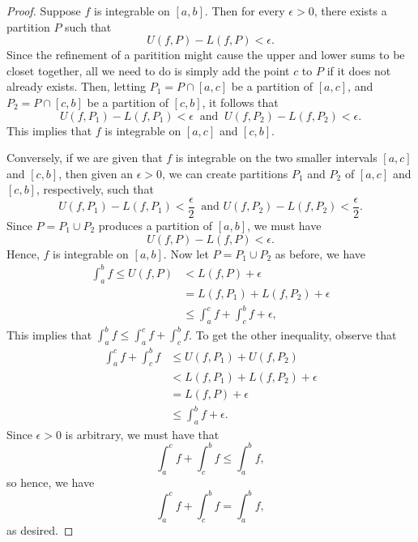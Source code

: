 \begin{proof}
	Suppose \( f \) is integrable on \( [a,b]  \). Then for every \( \epsilon > 0   \), there exists a partition \( P  \) such that 
	\[  U(f,P) - L(f,P) < \epsilon. \]
	Since the refinement of a paritition might cause the upper and lower sums to be closet together, all we need to do is simply add the point \( c  \) to \( P  \) if it does not already exists. Then, letting \( P_{1} = P \cap [a,c]  \) be a partition of \( [a,c]  \), and \( P_{2} = P \cap [c,b]  \) be a partition of \( [c,b]  \), it follows that 
	\[  U(f,P_{1}) - L(f, P_{1}) < \epsilon \ \text{ and } \ U(f, P_{2}) - L(f, P_{2}) < \epsilon. \] This implies that \( f  \) is integrable on \( [a,c]  \) and \( [c,b]  \).

	Conversely, if we are given that \( f  \) is integrable on the two smaller intervals \( [a,c]  \) and \( [c,b] \), then given an \( \epsilon > 0  \), we can create partitions \( P_{1}   \) and \( P_{2} \) of \( [a,c] \) and \( [c,b] \), respectively, such that 
	\[  U(f, P_{1}) - L(f, P_{1}) < \frac{ \epsilon  }{ 2  } \ \text{ and } U(f, P_{2}) - L(f,P_{2}) < \frac{ \epsilon  }{ 2 }.  \]
	Since \( P = P_{1} \cup P_{2}  \) produces a partition of \( [a,b]  \), we must have 
	\[ U(f, P) - L(f,P) < \epsilon.  \] Hence, \( f  \) is integrable on \( [a,b]  \).
	Now let \( P = P_{1} \cup P_{2} \) as before, we have 
	\begin{align*}
		\int_{ a }^{ b } f  \leq U(f, P) &< L(f, P)  + \epsilon  \\
										 &= L(f, P_{1}) + L(f, P_{2}) + \epsilon \\
										 &\leq \int_{ a }^{ c } f  + \int_{ c }^{ b } f + \epsilon,
	\end{align*}
	This implies that \( \int_{ a }^{ b } f \leq \int_{ a }^{ c }f + \int_{ c }^{ b }  f \). To get the other inequality, observe that 
	\begin{align*}
	    \int_{ a }^{ c } f + \int_{ c }^{ b } f   &\leq U(f, P_{1}) + U(f, P_{2})  \\
												  &< L(f, P_{1}) + L(f, P_{2}) + \epsilon \\
												  &= L(f, P) + \epsilon \\
												  &\leq \int_{ a }^{ b } f + \epsilon.
	\end{align*}
	Since \( \epsilon > 0  \) is arbitrary, we must have that 
	\[  \int_{ a }^{ c } f + \int_{ c }^{ b } f \leq \int_{ a }^{ b } f, \]
	so hence, we have 
	\[  \int_{ a }^{ c } f  + \int_{ c }^{ b } f = \int_{ a }^{ b } f, \]
	as desired.
\end{proof}

